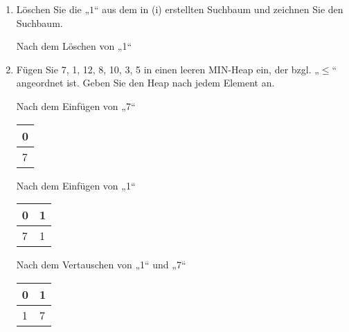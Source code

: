 \documentclass{bschlangaul-aufgabe}
\begin{document}
\begin{enumerate}
\begin{enumerate}

\item Löschen Sie die „$1$“ aus dem in (i) erstellten Suchbaum und
zeichnen Sie den Suchbaum.

\begin{bAntwort}
\begin{bBaum}{Nach dem Löschen von „1“}
\end{bBaum}
\end{bAntwort}


\item Fügen Sie 7, 1, 12, 8, 10, 3, 5 in einen leeren MIN-Heap ein,
der bzgl. „$\leq$“ angeordnet ist.
Geben Sie den Heap nach jedem Element an.

\begin{bAntwort}
\begin{bBaum}{Nach dem Einfügen von „7“}
\begin{tabular}{l}
\bf{0} \\
\hline
7      \\
\end{tabular}

\end{bBaum}

\begin{bBaum}{Nach dem Einfügen von „1“}
\begin{tabular}{ll}
\bf{0} & \bf{1} \\
\hline
7      & 1      \\
\end{tabular}

\end{bBaum}

\begin{bBaum}{Nach dem Vertauschen von „1“ und „7“}
\begin{tabular}{ll}
\bf{0} & \bf{1} \\
\hline
1      & 7      \\
\end{tabular}


\end{bBaum}
\end{bAntwort}
\end{enumerate}
\end{enumerate}
\end{document}
